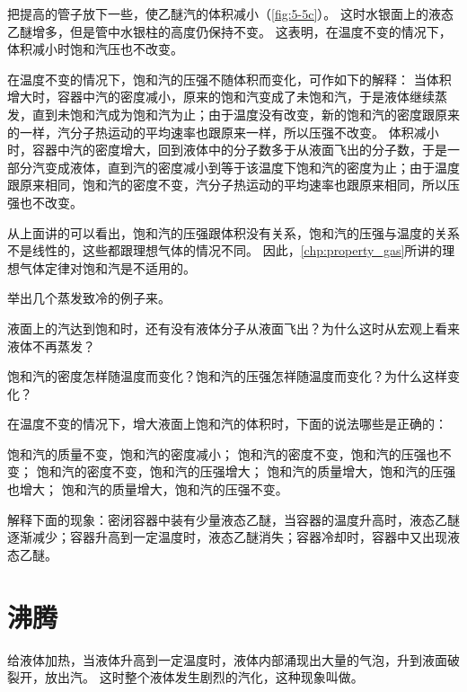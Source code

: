\medskip
把提高的管子放下一些，使乙醚汽的体积减小（\cref{fig:5-5c}）。
这时水银面上的液态乙醚增多，但是管中水银柱的高度仍保持不变。
这表明，在温度不变的情况下，体积减小时饱和汽压也不改变。

在温度不变的情况下，饱和汽的压强不随体积而变化，可作如下的解释：
当体积增大时，容器中汽的密度减小，原来的饱和汽变成了未饱和汽，于是液体继续蒸发，直到未饱和汽成为饱和汽为止；由于温度没有改变，新的饱和汽的密度跟原来的一样，汽分子热运动的平均速率也跟原来一样，所以压强不改变。
体积减小时，容器中汽的密度增大，回到液体中的分子数多于从液面飞出的分子数，于是一部分汽变成液体，直到汽的密度减小到等于该温度下饱和汽的密度为止；由于温度跟原来相同，饱和汽的密度不变，汽分子热运动的平均速率也跟原来相同，所以压强也不改变。

从上面讲的可以看出，饱和汽的压强跟体积没有关系，饱和汽的压强与温度的关系不是线性的，这些都跟理想气体的情况不同。
因此，\cref{chp:property_gas}所讲的理想气体定律对饱和汽是不适用的。

\begin{Practice}
\begin{question}
  \item 举出几个蒸发致冷的例子来。
  \item 液面上的汽达到饱和时，还有没有液体分子从液面飞出？为什么这时从宏观上看来液体不再蒸发？
  \item 饱和汽的密度怎样随温度而变化？饱和汽的压强怎祥随温度而变化？为什么这样变化？
  \item 在温度不变的情况下，增大液面上饱和汽的体积时，下面的说法哪些是正确的：
  \begin{tasks}
    \task 饱和汽的质量不变，饱和汽的密度减小；
    \task 饱和汽的密度不变，饱和汽的压强也不变；
    \task 饱和汽的密度不变，饱和汽的压强增大；
    \task 饱和汽的质量增大，饱和汽的压强也增大；
    \task 饱和汽的质量增大，饱和汽的压强不变。
  \end{tasks}
  \item 解释下面的现象：密闭容器中装有少量液态乙醚，当容器的温度升高时，液态乙醚逐渐减少；容器升高到一定温度时，液态乙醚消失；容器冷却时，容器中又出现液态乙醚。
\end{question}
\end{Practice}

\section{沸腾}
给液体加热，当液体升高到一定温度时，液体内部涌现出大量的气泡，升到液面破裂开，放出汽。
这时整个液体发生剧烈的汽化，这种现象叫做。

